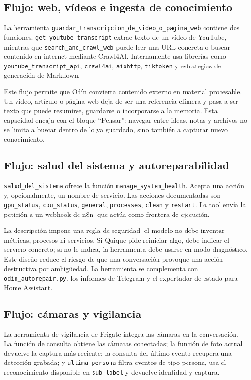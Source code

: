 
\subsection{Flujo: web, vídeos e ingesta de conocimiento}
La herramienta \texttt{guardar\_transcripcion\_de\_video\_o\_pagina\_web} contiene dos funciones. \texttt{get\_youtube\_transcript} extrae texto de un vídeo de YouTube, mientras que \texttt{search\_and\_crawl\_web} puede leer una URL concreta o buscar contenido en internet mediante Crawl4AI. Internamente usa librerías como \texttt{youtube\_transcript\_api}, \texttt{crawl4ai}, \texttt{aiohttp}, \texttt{tiktoken} y estrategias de generación de Markdown.

Este flujo permite que Odín convierta contenido externo en material procesable. Un vídeo, artículo o página web deja de ser una referencia efímera y pasa a ser texto que puede resumirse, guardarse o incorporarse a la memoria. Esta capacidad encaja con el bloque ``Pensar'': navegar entre ideas, notas y archivos no se limita a buscar dentro de lo ya guardado, sino también a capturar nuevo conocimiento.

\subsection{Flujo: salud del sistema y autoreparabilidad}
\texttt{salud\_del\_sistema} ofrece la función \texttt{manage\_system\_health}. Acepta una acción y, opcionalmente, un nombre de servicio. Las acciones documentadas son \texttt{gpu\_status}, \texttt{cpu\_status}, \texttt{general}, \texttt{processes}, \texttt{clean} y \texttt{restart}. La tool envía la petición a un webhook de n8n, que actúa como frontera de ejecución.

La descripción impone una regla de seguridad: el modelo no debe inventar métricas, procesos ni servicios. Si Quique pide reiniciar algo, debe indicar el servicio concreto; si no lo indica, la herramienta debe usarse en modo diagnóstico. Este diseño reduce el riesgo de que una conversación provoque una acción destructiva por ambigüedad. La herramienta se complementa con \texttt{odin\_autorepair.py}, los informes de Telegram y el exportador de estado para Home Assistant.

\subsection{Flujo: cámaras y vigilancia}
La herramienta de vigilancia de Frigate integra las cámaras en la conversación. La función de consulta obtiene las cámaras conectadas; la función de foto actual devuelve la captura más reciente; la consulta del último evento recupera una detección grabada; y \texttt{ultima\_persona} filtra eventos de tipo persona, usa el reconocimiento disponible en \texttt{sub\_label} y devuelve identidad y captura.

